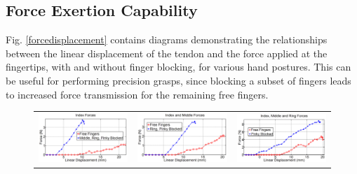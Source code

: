 \subsection{Force Exertion Capability}

Fig. \ref{forcedisplacement} contains diagrams demonstrating the relationships between the linear displacement of the tendon and the force applied at the fingertips, with and without finger blocking, for various hand postures. This can be useful for performing precision grasps, since blocking a subset of fingers leads to increased force transmission for the remaining free fingers.


\begin{figure}[h]
\centering
\begin{tabular}{ c c c }
\includegraphics[scale=0.22]{figures/paper_images/indexforces.jpg} &
\includegraphics[scale=0.22]{figures/paper_images/indexmiddleforces.jpg} &
\includegraphics[scale=0.22]{figures/paper_images/indexmiddleringforces.jpg}\\ 

\end{tabular}
\end{figure}
